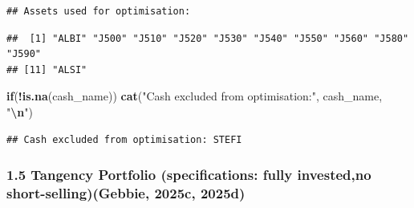 \documentclass[
  12pt,
]{article}
\newenvironment{Shaded}{\begin{snugshade}}{\end{snugshade}}
\newcommand{\ControlFlowTok}[1]{\textcolor[rgb]{0.13,0.29,0.53}{\textbf{#1}}}
\newcommand{\FunctionTok}[1]{\textcolor[rgb]{0.13,0.29,0.53}{\textbf{#1}}}
\newcommand{\NormalTok}[1]{#1}
\newcommand{\SpecialCharTok}[1]{\textcolor[rgb]{0.81,0.36,0.00}{\textbf{#1}}}
\newcommand{\StringTok}[1]{\textcolor[rgb]{0.31,0.60,0.02}{#1}}
\begin{document}
\begin{verbatim}
## Assets used for optimisation:
\end{verbatim}

\begin{verbatim}
##  [1] "ALBI" "J500" "J510" "J520" "J530" "J540" "J550" "J560" "J580" "J590"
## [11] "ALSI"
\end{verbatim}

\begin{Shaded}
\begin{Highlighting}[]
\ControlFlowTok{if}\NormalTok{(}\SpecialCharTok{!}\FunctionTok{is.na}\NormalTok{(cash\_name)) }\FunctionTok{cat}\NormalTok{(}\StringTok{"Cash excluded from optimisation:"}\NormalTok{, cash\_name, }\StringTok{"}\SpecialCharTok{\textbackslash{}n}\StringTok{"}\NormalTok{)}
\end{Highlighting}
\end{Shaded}

\begin{verbatim}
## Cash excluded from optimisation: STEFI
\end{verbatim}

\subsubsection{1.5 Tangency Portfolio (specifications: fully invested,no
short-selling)(Gebbie, 2025c,
2025d)}\label{tangency-portfolio-specifications-fully-investedno-short-sellingtim_btmlx-tim_prep}
\end{document}
